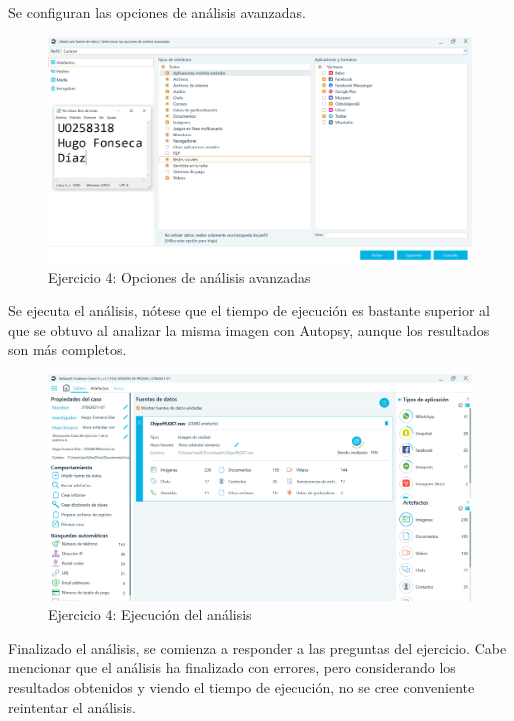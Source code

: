 \documentclass[11pt]{article}
\begin{document}
Se configuran las opciones de análisis avanzadas.

\begin{figure}[H]
    \caption{Ejercicio 4: Opciones de análisis avanzadas}
    \centering
    \includegraphics[scale=0.4]{p04/e7-4.PNG}
\end{figure}

Se ejecuta el análisis, nótese que el tiempo de ejecución es bastante superior al que se obtuvo al analizar la misma imagen con Autopsy, aunque los resultados son más completos.

\begin{figure}[H]
    \caption{Ejercicio 4: Ejecución del análisis}
    \centering
    \includegraphics[scale=0.4]{p04/e7-6.PNG}
\end{figure}

Finalizado el análisis, se comienza a responder a las preguntas del ejercicio. Cabe mencionar que el análisis ha finalizado con errores, pero considerando los resultados obtenidos y viendo el tiempo de ejecución, no se cree conveniente reintentar el análisis.
\end{document}
